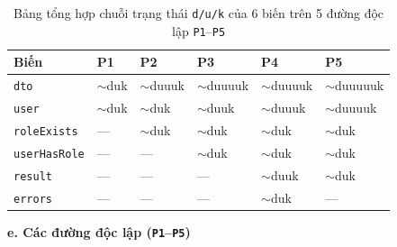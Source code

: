 \documentclass[11pt,a4paper]{article}
\begin{document}
\begin{table}[H]
\centering
\small
\begin{tabularx}{\textwidth}{|X|C{2.2cm}|C{2.2cm}|C{2.2cm}|C{2.2cm}|C{2.2cm}|}
\hline
{}
\textbf{Biến} & \textbf{P1} & \textbf{P2} & \textbf{P3} & \textbf{P4} & \textbf{P5} \tabularnewline
\hline
\texttt{dto} & $\sim$duk & $\sim$duuuk & $\sim$duuuuk & $\sim$duuuuk & $\sim$duuuuuk \\ \hline
\texttt{user} & $\sim$duk & $\sim$duk & $\sim$duuk & $\sim$duuuk & $\sim$duuuuk \\ \hline
\texttt{roleExists} & --- & $\sim$duk & $\sim$duk & $\sim$duk & $\sim$duk \\ \hline
\texttt{userHasRole} & --- & --- & $\sim$duk & $\sim$duk & $\sim$duk \\ \hline
\texttt{result} & --- & --- & --- & $\sim$duuk & $\sim$duk \\ \hline
\texttt{errors} & --- & --- & --- & $\sim$duk & --- \\ \hline
\end{tabularx}
\caption{Bảng tổng hợp chuỗi trạng thái \texttt{d/u/k} của 6 biến trên 5 đường độc lập \texttt{P1}--\texttt{P5}}
\end{table}

\noindent\textbf{e. Các đường độc lập (\texttt{P1}--\texttt{P5})}
\end{document}
